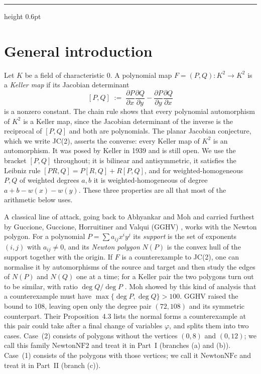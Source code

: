 \documentclass[a4paper,11pt]{article}
\theoremstyle{jsplain}
\theoremstyle{jsdef}
\theoremstyle{jsrem}
\begin{document}
\vspace{0.6cm}
{\color{borderhairline}\hrule height 0.6pt}
\vspace{0.6cm}

\tableofcontents
\newpage

\section*{General introduction}\label{gen:intro}

Let $K$ be a field of characteristic $0$. A polynomial map $F=(P,Q)\colon K^2\to K^2$ is a \emph{Keller map} if its Jacobian determinant
\[
[P,Q] \;:=\; \frac{\partial P}{\partial x}\frac{\partial Q}{\partial y}-\frac{\partial P}{\partial y}\frac{\partial Q}{\partial x}
\]
is a nonzero constant. The chain rule shows that every polynomial automorphism of $K^2$ is a Keller map, since the Jacobian determinant of the inverse is the reciprocal of $[P,Q]$ and both are polynomials. The planar Jacobian conjecture, which we write JC(2), asserts the converse: every Keller map of $K^2$ is an automorphism. It was posed by Keller in 1939 and is still open. We use the bracket $[P,Q]$ throughout; it is bilinear and antisymmetric, it satisfies the Leibniz rule $[PR,Q]=P[R,Q]+R[P,Q]$, and for weighted-homogeneous $P,Q$ of weighted degrees $a,b$ it is weighted-homogeneous of degree $a+b-w(x)-w(y)$. These three properties are all that most of the arithmetic below uses.

A classical line of attack, going back to Abhyankar and Moh and carried furthest by Guccione, Guccione, Horruitiner and Valqui (GGHV) \cite{GGHV}, works with the Newton polygon. For a polynomial $P=\sum a_{ij}x^iy^j$ its \emph{support} is the set of exponents $(i,j)$ with $a_{ij}\ne0$, and its \emph{Newton polygon} $N(P)$ is the convex hull of the support together with the origin. If $F$ is a counterexample to JC(2), one can normalise it by automorphisms of the source and target and then study the edges of $N(P)$ and $N(Q)$ one at a time; for a Keller pair the two polygons turn out to be similar, with ratio $\deg Q/\deg P$ \cite{GGHV}. Moh \cite{Moh} showed by this kind of analysis that a counterexample must have $\max\{\deg P,\deg Q\}>100$. GGHV raised the bound to $108$, leaving open only the degree pair $(72,108)$ and its symmetric counterpart. Their Proposition~4.3 lists the normal forms a counterexample at this pair could take after a final change of variables $\varphi$, and splits them into two cases. Case~(2) consists of polygons without the vertices $(0,8)$ and $(0,12)$; we call this family $\mathrm{NewtonNF2}$ and treat it in Part~I (branches (a) and (b)). Case~(1) consists of the polygons with those vertices; we call it $\mathrm{NewtonNFc}$ and treat it in Part~II (branch (c)).
\end{document}

